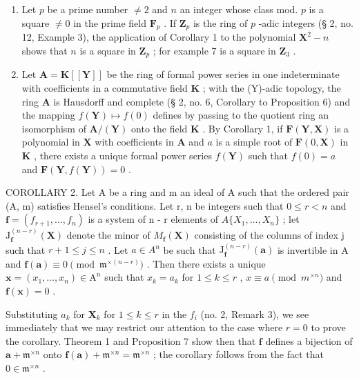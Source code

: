 \begin{enumerate}
\def\labelenumi{(\arabic{enumi})}
\item
  Let \(p\) be a prime number \(\neq 2\) and \(n\) an integer whose class mod. \(p\) is a square \(\neq 0\) in the prime field \(\mathbf{F}_p\) . If \(\mathbf{Z}_p\) is the ring of \(p\) -adic integers (§ 2, no. 12, Example 3), the application of Corollary 1 to the polynomial \(\mathbf{X}^2 - n\) shows that \(n\) is a square in \(\mathbf{Z}_p\) ; for example 7 is a square in \(\mathbf{Z}_3\) .
\item
  Let \(\mathbf{A} = \mathbf{K}[[\mathbf{Y}]]\) be the ring of formal power series in one indeterminate with coefficients in a commutative field \(\mathbf{K}\) ; with the (Y)-adic topology, the ring \(\mathbf{A}\) is Hausdorff and complete (§ 2, no. 6, Corollary to Proposition 6) and the mapping \(f(\mathbf{Y}) \mapsto f(0)\) defines by passing to the quotient ring an isomorphism of \(\mathbf{A}/(\mathbf{Y})\) onto the field \(\mathbf{K}\) . By Corollary 1, if \(\mathbf{F}(\mathbf{Y}, \mathbf{X})\) is a polynomial in \(\mathbf{X}\) with coefficients in \(\mathbf{A}\) and \(a\) is a simple root of \(\mathbf{F}(0, \mathbf{X})\) in \(\mathbf{K}\) , there exists a unique formal power series \(f(\mathbf{Y})\) such that \(f(0) = a\) and \(\mathbf{F}(\mathbf{Y}, f(\mathbf{Y})) = 0\) .
\end{enumerate}

COROLLARY 2. Let A be a ring and m an ideal of A such that the ordered pair (A, m) satisfies Hensel's conditions. Let r, n be integers such that \(0 \leqslant r < n\) and \(\mathbf{f} = (f_{r+1}, \ldots, f_n)\) is a system of n - r elements of \(A\{X_1, \ldots, X_n\}\) ; let \(\mathrm{J}_{\mathbf{f}}^{(n-r)}(\mathbf{X})\) denote the minor of \(M_{\mathbf{f}}(\mathbf{X})\) consisting of the columns of index j such that \(r + 1 \leqslant j \leqslant n\) . Let \(a \in A^n\) be such that \(\mathrm{J}_{\mathbf{f}}^{(n-r)}(\mathbf{a})\) is invertible in A and \(\mathbf{f}(\mathbf{a}) \equiv 0 \pmod{\mathfrak{m}^{\times(n-r)}}\) . Then there exists a unique \(\mathbf{x} = (x_1, \ldots, x_n) \in \mathrm{A}^n\) such that \(x_k = a_k\) for \(1 \leqslant k \leqslant r\) , \(x \equiv a \pmod{m^{\times n}}\) and \(\mathbf{f}(\mathbf{x}) = 0\) .

Substituting \(a_k\) for \(\mathbf{X}_k\) for \(1 \leqslant k \leqslant r\) in the \(f_i\) (no. 2, Remark 3), we see immediately that we may restrict our attention to the case where \(r = 0\) to prove the corollary. Theorem 1 and Proposition 7 show then that \(\mathbf{f}\) defines a bijection of \(\mathbf{a} + \mathfrak{m}^{\times n}\) onto \(\mathbf{f}(\mathbf{a}) + \mathfrak{m}^{\times n} = \mathfrak{m}^{\times n}\) ; the corollary follows from the fact that \(0 \in \mathfrak{m}^{\times n}\) .

